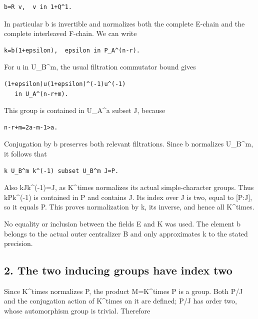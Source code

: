 \begin{Verbatim}[fontsize=\small,breaklines=true,breakanywhere=true]
b=R v,  v in 1+Q^1.
\end{Verbatim}

In particular b is invertible and normalizes both the complete E-chain
and the complete interleaved F-chain. We can write

\begin{Verbatim}[fontsize=\small,breaklines=true,breakanywhere=true]
k=b(1+epsilon),  epsilon in P_A^(n-r).
\end{Verbatim}

For u in U\_B\^{}m, the usual filtration commutator bound gives

\begin{Verbatim}[fontsize=\small,breaklines=true,breakanywhere=true]
(1+epsilon)u(1+epsilon)^(-1)u^(-1)
   in U_A^(n-r+m).
\end{Verbatim}

This group is contained in U\_A\^{}a subset J, because

\begin{Verbatim}[fontsize=\small,breaklines=true,breakanywhere=true]
n-r+m=2a-m-1>a.
\end{Verbatim}

Conjugation by b preserves both relevant filtrations. Since b normalizes
U\_B\^{}m, it follows that

\begin{Verbatim}[fontsize=\small,breaklines=true,breakanywhere=true]
k U_B^m k^(-1) subset U_B^m J=P.
\end{Verbatim}

Also kJk\^{}(-1)=J, as K\^{}times normalizes its actual simple-character
groups. Thus kPk\^{}(-1) is contained in P and contains J. Its index
over J is two, equal to {[}P:J{]}, so it equals P. This proves
normalization by k, its inverse, and hence all K\^{}times.

No equality or inclusion between the fields E and K was used. The
element b belongs to the actual outer centralizer B and only
approximates k to the stated precision.

\hypertarget{rank~4_stages-the-two-inducing-groups-have-index-two}{%
\subsection{2. The two inducing groups have index
two}\label{rank~4_stages-the-two-inducing-groups-have-index-two}}

Since K\^{}times normalizes P, the product M=K\^{}times P is a group.
Both P/J and the conjugation action of K\^{}times on it are defined; P/J
has order two, whose automorphism group is trivial. Therefore

